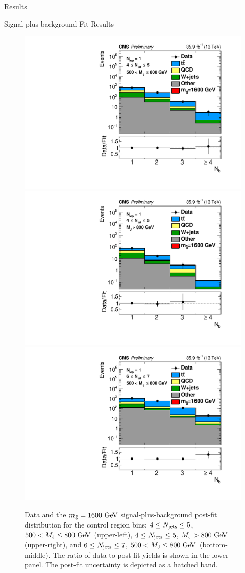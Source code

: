 \begin{section}{Results}
\begin{subsection}{Signal-plus-background Fit Results}
\begin{figure}[tbp!]
\centering
\includegraphics[angle=0,width=0.45\columnwidth]{fig/splusb_nlep1_nj45_lowmj.pdf}
\includegraphics[angle=0,width=0.45\columnwidth]{fig/splusb_nlep1_nj45_highmj.pdf}
\includegraphics[angle=0,width=0.45\columnwidth]{fig/splusb_nlep1_nj67_lowmj.pdf}
\caption{Data and the $m_{\tilde{\mathrm{g}}} = 1600~\mathrm{Ge\kern -0.1em V}$ signal-plus-background post-fit \Nb distribution for the control region bins: $4 \leq N_{\mathrm{jets}} \leq 5$, $500 < M_{\mathrm{J}} \leq 800~\mathrm{Ge\kern -0.1em V}$ (upper-left), $4 \leq N_{\mathrm{jets}} \leq 5$, $M_{\mathrm{J}} > 800~\mathrm{Ge\kern -0.1em V}$ (upper-right), and $6 \leq N_{\mathrm{jets}} \leq 7$, $500 < M_{\mathrm{J}} \leq 800~\mathrm{Ge\kern -0.1em V}$ (bottom-middle).
The ratio of data to post-fit yields is shown in the lower panel.
The post-fit uncertainty is depicted as a hatched band.}
\label{fig:splusb_cr}
\end{figure}


\end{subsection}
\end{section}
